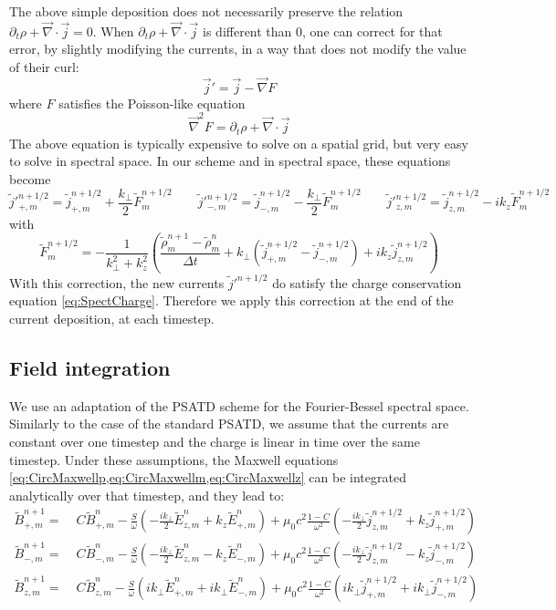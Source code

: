 \documentclass[a4paper]{article}   	%
\newcommand{\tB}[2]{\tilde{B}_{#1,m}^{#2}}
\newcommand{\tE}[2]{\tilde{E}_{#1,m}^{#2}}
\newcommand{\tj}[2]{\tilde{j}_{#1,m}^{#2}}
\begin{document}
The above simple deposition does not necessarily
preserve the relation $\partial_t\rho + \vec{\nabla}\cdot\vec{j} =
0$. When $\partial_t\rho + \vec{\nabla}\cdot\vec{j}$ is different than 0,
one can correct for that error, by slightly modifying the currents, in
a way that does not modify the value of their curl:
\[ \vec{j}' = \vec{j} - \vec{\nabla} F \]
where $F$ satisfies the Poisson-like equation
\[ \vec{\nabla}^2 F = \partial_t\rho + \vec{\nabla}\cdot\vec{j} \]
The above equation is typically expensive to solve on a spatial grid, but
very easy to solve in spectral space. In our scheme and in spectral
space, these equations become
\[ \tilde{j}'^{n+1/2}_{+,m} = \tilde{j}^{n+1/2}_{+,m} +
\frac{k_\perp}{2} \tilde{F}^{n+1/2}_m
\qquad
\tilde{j}'^{n+1/2}_{-,m} = \tilde{j}^{n+1/2}_{-,m} - \frac{k_\perp}{2} \tilde{F}^{n+1/2}_m
\qquad \tilde{j}'^{n+1/2}_{z,m} = \tilde{j}^{n+1/2}_{z,m} - ik_z
\tilde{F}^{n+1/2}_m\]
with
\[ \tilde{F}^{n+1/2}_m = - \frac{1}{k_\perp^2 + k_z^2}\left(
  \frac{\tilde{\rho}^{n+1}_m -\tilde{\rho}^{n}_m}{\Delta t} + k_\perp
  (\tilde{j}^{n+1/2}_{+,m} -\tilde{j}^{n+1/2}_{-,m}) + ik_z\tilde{j}^{n+1/2}_{z,m}  \right) \]
With this correction, the new currents $\tilde{j}'^{n+1/2}$ do satisfy
the charge conservation equation \cref{eq:SpectCharge}. Therefore we apply this
correction at the end of the current deposition, at each timestep.

\subsection{Field integration}
\label{sec:FieldIntegration}

We use an adaptation of the PSATD scheme \cite{Haber} for the
Fourier-Bessel spectral space. Similarly to the case of the standard
PSATD, we assume that the currents are constant over one timestep and
the charge is linear in time over the same timestep. Under these
assumptions, the Maxwell equations \cref{eq:CircMaxwellp,eq:CircMaxwellm,eq:CircMaxwellz} can be integrated
analytically over that timestep, and they lead to:
\begin{align*}
\tB{+}{n+1} = \; & C \tB{+}{n} - 
\frac{S}{\omega}\left(-\frac{ik_\perp }{2} \tE{z}{n} + k_z\tE{+}{n}
\right) + \mu_0 c^2\frac{1-C}{\omega^2} \left( -\frac{ik_\perp }{2}
  \tj{z}{n+1/2} + k_z \tj{+}{n+1/2} \right)& \\
\tB{-}{n+1} =\; & C \tB{-}{n} - 
\frac{S}{\omega}\left(- \frac{ik_\perp }{2} \tE{z}{n} - k_z\tE{-}{n}
\right) + \mu_0 c^2\frac{1-C}{\omega^2} \left( - \frac{ik_\perp }{2}
  \tj{z}{n+1/2} - k_z \tj{-}{n+1/2} \right) &\\
\tB{z}{n+1} =\; & C \tB{z}{n} - 
\frac{S}{\omega}\left(ik_\perp \tE{+}{n} + ik_\perp \tE{-}{n}
\right) + \mu_0 c^2\frac{1-C}{\omega^2} \left( ik_\perp
  \tj{+}{n+1/2} + ik_\perp \tj{-}{n+1/2} \right)&
\end{align*}
\end{document}
